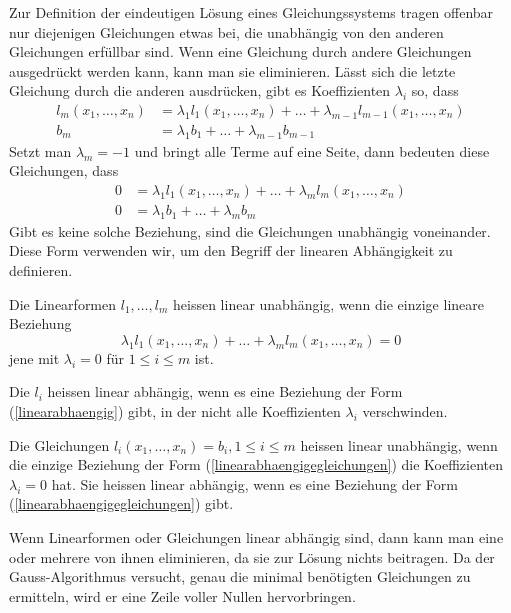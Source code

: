 Zur Definition der eindeutigen Lösung eines Gleichungssystems 
tragen offenbar nur diejenigen Gleichungen etwas bei, die unabhängig
von den anderen Gleichungen erfüllbar sind.
Wenn eine Gleichung
durch andere Gleichungen ausgedrückt werden kann, kann man sie
eliminieren.
Lässt sich die letzte Gleichung durch die
anderen ausdrücken, gibt es Koeffizienten $\lambda_i$ so, dass
\begin{equation*}
\begin{aligned}
l_m(x_1,\dots,x_n)&=\lambda_1 l_1(x_1,\dots,x_n)+\dots+\lambda_{m-1}l_{m-1}(x_1,\dots, x_n)\\
b_m&=\lambda_1b_1+\dots+\lambda_{m-1}b_{m-1}
\end{aligned}
\end{equation*}
Setzt man $\lambda_m=-1$ und bringt alle Terme auf eine Seite,
dann bedeuten diese Gleichungen, dass
\begin{equation}
\begin{aligned}
0&=\lambda_1l_1(x_1,\dots,x_n)+\dots+\lambda_ml_m(x_1,\dots,x_n)\\
0&=\lambda_1b_1+\dots+\lambda_mb_m
\end{aligned}
\label{linearabhaengigegleichungen}
\end{equation}
Gibt es keine solche Beziehung, sind die Gleichungen unabhängig
voneinander.
Diese Form verwenden wir, um den Begriff der linearen Abhängigkeit
zu definieren.
\begin{definition}
Die Linearformen $l_1,\dots,l_m$ heissen linear unabhängig,
wenn die einzige lineare Beziehung
\begin{equation}
\lambda_1l_1(x_1,\dots,x_n)+\dots+\lambda_ml_m(x_1,\dots,x_n)=0
\label{linearabhaengig}
\end{equation}
jene mit $\lambda_i=0$ für $1\le i\le m$ ist.

Die $l_i$ heissen linear abhängig, wenn es eine Beziehung der Form
(\ref{linearabhaengig})
gibt, in der nicht alle Koeffizienten $\lambda_i$ verschwinden.

Die Gleichungen $l_i(x_1,\dots,x_n)=b_i,1\le i\le m$ heissen linear unabhängig,
wenn  die einzige Beziehung der Form (\ref{linearabhaengigegleichungen})
die Koeffizienten $\lambda_i=0$ hat.
Sie heissen linear abhängig, wenn
es eine Beziehung der Form (\ref{linearabhaengigegleichungen}) gibt.
\end{definition}

Wenn Linearformen oder Gleichungen linear abhängig sind, dann kann
man eine oder mehrere von ihnen eliminieren, da sie zur Lösung nichts
beitragen.
Da der Gauss-Algorithmus versucht, genau die minimal benötigten Gleichungen
zu ermitteln, wird er eine Zeile voller Nullen hervorbringen.

